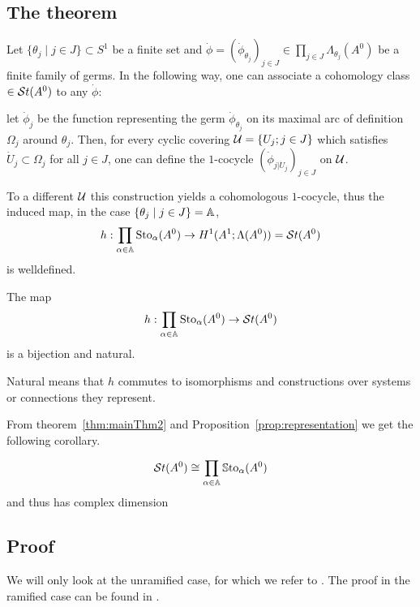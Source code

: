 \subsection{The theorem}
Let $\{\theta_j\mid j\in J\}\subset S^1$ be a finite set and
$\dot\phi=(\dot\phi_{\theta_j})_{j\in J}\in\prod_{j\in J}\Lambda_{\theta_j}(A^0)$
be a finite family of germs.
In the following way, one can associate a cohomology class $\in\mathcal{S}{}t(A^0)$ to any
$\dot\phi$:
\begin{einr}
  let $\dot\phi_j$ be the function representing the germ
  $\dot\phi_{\theta_j}$ on its maximal arc of definition $\Omega_j$ around
  $\theta_j$.
  Then, for every cyclic covering $\mathcal{U}=\{U_j;j\in J\}$ which satisfies
  $\dot U_j\subset \Omega_j$ for all $j\in J$, one can define the $1$-cocycle
  $(\dot\phi_{j|\dot U_j})_{j\in J}$ on $\mathcal{U}$.
\end{einr}
To a different $\mathcal{U}$ this construction yields a cohomologous
$1$-cocycle\TODO[Proof], thus the induced map, in the case
$\{\theta_j\mid j\in J\}=\mathbb{A}$,
\[
  h:\prod_{\alpha\in\mathbb{A}}\operatorname{Sto}_\alpha(A^0)\to
  H^1(A^1;\Lambda(A^0))=\mathcal{S}{}t(A^0)
\]
is welldefined.
\begin{tthm}
  \label{thm:mainThm2}
  The map
  \[
    h:\prod_{\alpha\in\mathbb{A}}\operatorname{Sto}_\alpha(A^0)\to\mathcal{S}{}t(A^0)
  \]
  is a bijection and natural.
  \begin{s-rem}
    Natural means that $h$ commutes to isomorphisms and constructions over
    systems or connections they represent.
    \begin{comment}
      See \cite{Loday1994} Section III.3.3
    \end{comment}
  \end{s-rem}
\end{tthm}
From theorem~\ref{thm:mainThm2} and Proposition~\ref{prop:representation} we
get the following corollary.
\begin{cor}
  \[
    \mathcal{S}{}t(A^0) \cong \prod_{\alpha\in\mathbb{A}}\operatorname{\mathbb{S}to}_\alpha(A^0)
  \]
  and thus has complex dimension \TODO{}
\end{cor}

\subsection{Proof}
We will only look at the unramified case, for which we refer to
\cite[Sec.II.3]{Loday1994}.
The proof in the ramified case can be found in \cite[Sec.II.4]{Loday1994}.


